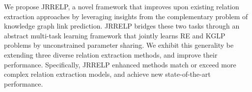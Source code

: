 We propose JRRELP, a novel framework that improves upon existing relation extraction approaches by leveraging insights from the complementary problem of knowledge graph link prediction. JRRELP bridges these two tasks through an abstract multi-task learning framework that jointly learns RE and KGLP problems by unconstrained parameter sharing. We exhibit this generality be extending three diverse relation extraction methods, and improve their performance. Specifically, JRRELP enhanced methods match or exceed more complex relation extraction models, and achieve new state-of-the-art performance.


